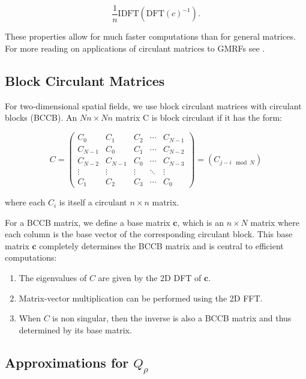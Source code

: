 \documentclass[
  12pt]{article}
\begin{document}
\[
\frac1n \text{IDFT}(\text{DFT}(c)^{-1}).
\]

These properties allow for much faster computations than for general
matrices. For more reading on applications of circulant matrices to
GMRFs see \citep{rue2005, gray2006}.

\subsection{Block Circulant Matrices}\label{block-circulant-matrices}

For two-dimensional spatial fields, we use block circulant matrices with
circulant blocks (BCCB). An \(Nn \times Nn\) matrix C is block circulant
if it has the form:

\[
C = \begin{pmatrix}
C_0 & C_1 & C_2 & \cdots & C_{N-1} \\
C_{N-1} & C_0 & C_1 & \cdots & C_{N-2} \\
C_{N-2} & C_{N-1} & C_0 & \cdots & C_{N-3} \\
\vdots & \vdots & \vdots & \ddots & \vdots \\
C_1 & C_2 & C_3 & \cdots & C_0
\end{pmatrix} = (C_{j-i \mod N})
\]

where each \(C_i\) is itself a circulant \(n \times n\) matrix.

For a BCCB matrix, we define a base matrix \(\mathbf c\), which is an
\(n \times N\) matrix where each column is the base vector of the
corresponding circulant block. This base matrix \(\mathbf c\) completely
determines the BCCB matrix and is central to efficient computations:

\begin{enumerate}
\def\labelenumi{\arabic{enumi}.}
\item
  The eigenvalues of \(C\) are given by the 2D DFT of \(\mathbf c\).
\item
  Matrix-vector multiplication can be performed using the 2D FFT.
\item
  When \(C\) is non singular, then the inverse is also a BCCB matrix and
  thus determined by its base matrix.
\end{enumerate}

\subsection{\texorpdfstring{Approximations for
\(Q_{\rho}\)}{Approximations for Q\_\{\textbackslash rho\}}}\label{approximations-for-q_rho}
\end{document}
